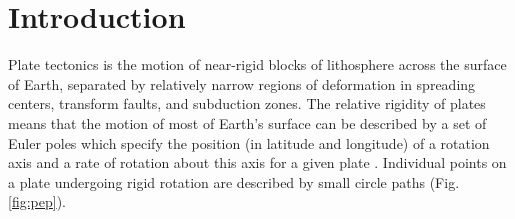 \documentclass[11pt,letterpaper]{article}
\providecommand{\DIFaddtex}[1]{{\protect\color{blue}\uwave{#1}}} %
\providecommand{\DIFaddbegin}{} %
\providecommand{\DIFaddend}{} %
\providecommand{\DIFadd}[1]{\texorpdfstring{\DIFaddtex{#1}}{#1}} %
\newcommand{\DIFaddincludegraphics}[2][]{{\color{blue}\fbox{\DIFOincludegraphics[#1]{#2}}}} %
\DeclareRobustCommand{\DIFaddbegin}{\DIFOaddbegin \let\includegraphics\DIFaddincludegraphics} %
\DeclareRobustCommand{\DIFaddend}{\DIFOaddend \let\includegraphics\DIFOincludegraphics} %
\begin{document}

\section*{Introduction}

Plate tectonics is the \DIFaddbegin \DIFadd{differential }\DIFaddend motion of near-rigid blocks of lithosphere across the surface of Earth, separated by relatively narrow regions of deformation in spreading centers, transform faults, and subduction zones. The relative rigidity of plates means that the motion of most of Earth's surface can be described by a set of Euler poles which specify the position (in latitude and longitude) of a rotation axis and a rate of rotation about this axis for a given plate \citep[cf.][]{Cox2009a}. Individual points on a plate undergoing rigid rotation are described by small circle paths (Fig. \ref{fig:pep}).
\end{document}
